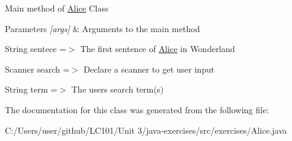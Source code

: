 Main method of \mbox{\hyperlink{classexercises_1_1_alice}{Alice}} Class 
\begin{DoxyParams}{Parameters}
{\em \mbox{[}args\mbox{]}} & Arguments to the main method \\
\hline
\end{DoxyParams}
String sentece =$>$ The first sentence of \mbox{\hyperlink{classexercises_1_1_alice}{Alice}} in Wonderland

Scanner search =$>$ Declare a scanner to get user input

String term =$>$ The user\textquotesingle{}s search term(s) 

The documentation for this class was generated from the following file\+:\begin{DoxyCompactItemize}
\item 
C\+:/\+Users/user/github/\+L\+C101/\+Unit 3/java-\/exercises/src/exercises/Alice.\+java\end{DoxyCompactItemize}
